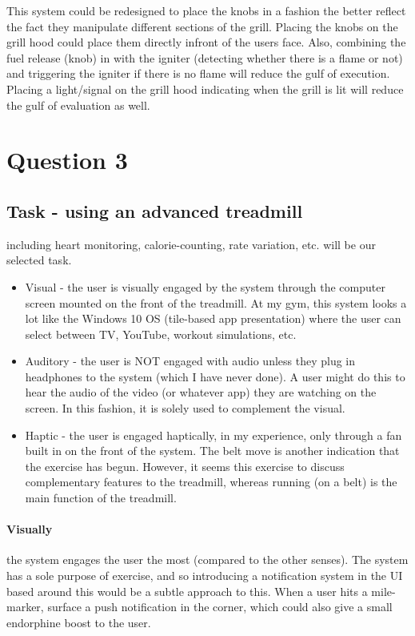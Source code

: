 This system could be redesigned to place the knobs in a fashion the better reflect the fact they manipulate different sections of the grill. Placing the knobs on the grill hood could place them directly infront of the users face. Also, combining the fuel release (knob) in with the igniter (detecting whether there is a flame or not) and triggering the igniter if there is no flame will reduce the gulf of execution. Placing a light/signal on the grill hood indicating when the grill is lit will reduce the gulf of evaluation as well.

\section{Question 3}

\subsection{Task - using an advanced treadmill}
including heart monitoring, calorie-counting, rate variation, etc. will be our selected task.

\begin{itemize}
\item
  Visual - the user is visually engaged by the system through the computer screen mounted on the front of the treadmill. At my gym, this system looks a lot like the Windows 10 OS (tile-based app presentation) where the user can select between TV, YouTube, workout simulations, etc.
\item
  Auditory - the user is NOT engaged with audio unless they plug in headphones to the system (which I have never done). A user might do this to hear the audio of the video (or whatever app) they are watching on the screen. In this fashion, it is solely used to complement the visual.
\item
  Haptic - the user is engaged haptically, in my experience, only through a fan built in on the front of the system. The belt move is another indication that the exercise has begun. However, it seems this exercise to discuss complementary features to the treadmill, whereas running (on a belt) is the main function of the treadmill.
\end{itemize}

\paragraph{Visually}
the system engages the user the most (compared to the other senses). The system has a sole purpose of exercise, and so introducing a notification system in the UI based around this would be a subtle approach to this. When a user hits a mile-marker, surface a push notification in the corner, which could also give a small endorphine boost to the user.

